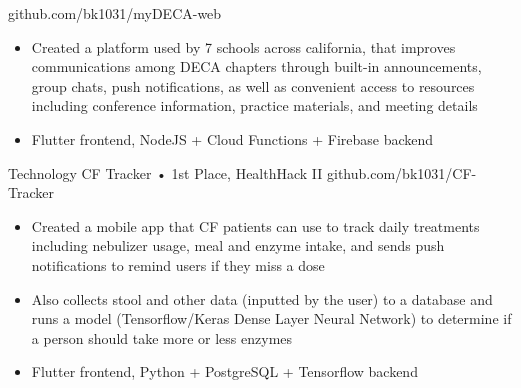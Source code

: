 \documentclass[9pt]{developercv} %
\begin{document}
\begin{entrylist}
		{github.com/bk1031/myDECA-web}
        {\vspace{-8pt}
        \begin{itemize}[noitemsep,topsep=0pt,parsep=0pt,partopsep=0pt, leftmargin=10pt]
            \item Created a platform used by 7 schools across california, that improves communications among DECA chapters through built-in announcements, group chats, push notifications, as well as convenient access to resources including conference information, practice materials, and meeting details
            \item Flutter frontend, NodeJS + Cloud Functions + Firebase backend
        \end{itemize}}
    \entry
		{Technology}
		{CF Tracker • 1st Place, HealthHack II}
		{github.com/bk1031/CF-Tracker}
        {\vspace{-8pt}
        \begin{itemize}[noitemsep,topsep=0pt,parsep=0pt,partopsep=0pt, leftmargin=10pt]
            \item Created a mobile app that CF patients can use to track daily treatments including nebulizer usage, meal and enzyme intake, and sends push notifications to remind users if they miss a dose
            \item Also collects stool and other data (inputted by the user) to a database and runs a model (Tensorflow/Keras Dense Layer Neural Network) to determine if a person should take more or less enzymes
            \item Flutter frontend, Python + PostgreSQL + Tensorflow backend
        \end{itemize}}
\end{entrylist}
\end{document}
